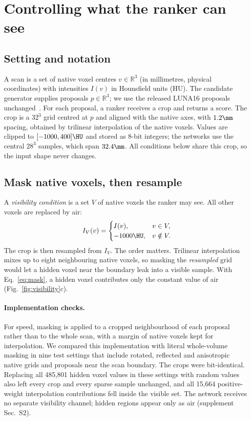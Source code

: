 \section{Controlling what the ranker can see}
\label{sec:visibility}

\subsection{Setting and notation}
\label{sec:setting}

A scan is a set of native voxel centres $v\in\mathbb{R}^3$ (in millimetres, physical coordinates) with intensities $I(v)$ in Hounsfield units (HU). The candidate generator supplies proposals $p\in\mathbb{R}^3$; we use the released LUNA16 proposals unchanged~\cite{setio2017luna16}. For each proposal, a ranker receives a crop and returns a score. The crop is a $32^3$ grid centred at $p$ and aligned with the native axes, with $1.2\mm$ spacing, obtained by trilinear interpolation of the native voxels. Values are clipped to $[-1000,400]\HU$ and stored as 8-bit integers; the networks use the central $28^3$ samples, which span $32.4\mm$. All conditions below share this crop, so the input shape never changes.

\subsection{Mask native voxels, then resample}
\label{sec:mask}

A \emph{visibility condition} is a set $V$ of native voxels the ranker may see. All other voxels are replaced by air:
\begin{equation}
 I_V(v)=
 \begin{cases}
 I(v), & v\in V,\\
 -1000\HU, & v\notin V .
 \end{cases}
 \label{eq:mask}
\end{equation}
The crop is then resampled from $I_V$. The order matters. Trilinear interpolation mixes up to eight neighbouring native voxels, so masking the \emph{resampled} grid would let a hidden voxel near the boundary leak into a visible sample. With Eq.~\eqref{eq:mask}, a hidden voxel contributes only the constant value of air (Fig.~\ref{fig:visibility}c). \paragraph{Implementation checks.} For speed, masking is applied to a cropped neighbourhood of each proposal rather than to the whole scan, with a margin of native voxels kept for interpolation. We compared this implementation with literal whole-volume masking in nine test settings that include rotated, reflected and anisotropic native grids and proposals near the scan boundary. The crops were bit-identical. Replacing all 485,801 hidden voxel values in these settings with random values also left every crop and every sparse sample unchanged, and all 15,664 positive-weight interpolation contributions fell inside the visible set. The network receives no separate visibility channel; hidden regions appear only as air (supplement Sec.~S2).

